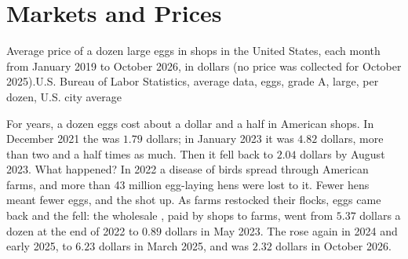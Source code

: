 \chapter{Markets and Prices}\label{ch:g7:markets-and-prices}

\begin{openingchart}{Average price of a dozen large eggs in shops in the United States,
each month from January 2019 to October 2026, in dollars (no price was collected for
October 2025).}{U.S. Bureau of Labor Statistics, average  data, eggs, grade A,
large, per dozen, U.S. city average}
\end{openingchart}

For years, a dozen eggs cost about a dollar and a half in American shops. In December
2021 the  was $1.79$ dollars; in January 2023 it was $4.82$ dollars, more than two and
a half times as much. Then it fell back to $2.04$ dollars by August 2023. What happened? In 2022
a disease of birds spread through American farms, and more than 43 million egg-laying hens
were lost to it. Fewer hens meant fewer eggs, and the  shot up. As farms restocked
their flocks, eggs came back and the  fell: the wholesale , paid by shops to
farms, went from $5.37$ dollars a dozen at the end of 2022 to $0.89$ dollars in May 2023.
The  rose again in 2024 and early 2025, to $6.23$ dollars in March 2025, and was
$2.32$ dollars in October 2026.

